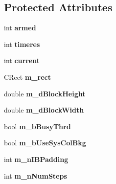\subsection*{Protected Attributes}
\begin{DoxyCompactItemize}
\item 
\hypertarget{class_cx_prog_ctrl_a1b4b07591e0d7495152cca5a6f233607}{int {\bfseries armed}}\label{class_cx_prog_ctrl_a1b4b07591e0d7495152cca5a6f233607}

\item 
\hypertarget{class_cx_prog_ctrl_a679c139744766f9ca5ed2430580a1285}{int {\bfseries timeres}}\label{class_cx_prog_ctrl_a679c139744766f9ca5ed2430580a1285}

\item 
\hypertarget{class_cx_prog_ctrl_a89b3e0cf4bec4136f5025f69822b4a35}{int {\bfseries current}}\label{class_cx_prog_ctrl_a89b3e0cf4bec4136f5025f69822b4a35}

\item 
\hypertarget{class_cx_prog_ctrl_aaa2b9d4f5bde27afa90b3770cfa16dbb}{C\-Rect {\bfseries m\-\_\-rect}}\label{class_cx_prog_ctrl_aaa2b9d4f5bde27afa90b3770cfa16dbb}

\item 
\hypertarget{class_cx_prog_ctrl_a75b40477bd8b488c85d7c4610fd80cee}{double {\bfseries m\-\_\-d\-Block\-Height}}\label{class_cx_prog_ctrl_a75b40477bd8b488c85d7c4610fd80cee}

\item 
\hypertarget{class_cx_prog_ctrl_ac874eff6c97c1db2baea833c29c1c3aa}{double {\bfseries m\-\_\-d\-Block\-Width}}\label{class_cx_prog_ctrl_ac874eff6c97c1db2baea833c29c1c3aa}

\item 
\hypertarget{class_cx_prog_ctrl_aac4968bd3ebd94d56263c1abd2d34ff0}{bool {\bfseries m\-\_\-b\-Busy\-Thrd}}\label{class_cx_prog_ctrl_aac4968bd3ebd94d56263c1abd2d34ff0}

\item 
\hypertarget{class_cx_prog_ctrl_a559f71746bbe4b021527d5541348fec6}{bool {\bfseries m\-\_\-b\-Use\-Sys\-Col\-Bkg}}\label{class_cx_prog_ctrl_a559f71746bbe4b021527d5541348fec6}

\item 
\hypertarget{class_cx_prog_ctrl_a3079c9bf4b1ca78718ae33c21eb3471b}{int {\bfseries m\-\_\-n\-I\-B\-Padding}}\label{class_cx_prog_ctrl_a3079c9bf4b1ca78718ae33c21eb3471b}

\item 
\hypertarget{class_cx_prog_ctrl_aedf7c4bbb99c7015b5b3935d13bd43b4}{int {\bfseries m\-\_\-n\-Num\-Steps}}\label{class_cx_prog_ctrl_aedf7c4bbb99c7015b5b3935d13bd43b4}


\end{DoxyCompactItemize}
